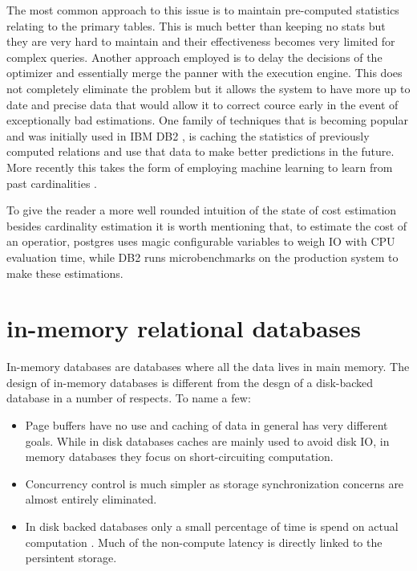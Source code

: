 The most common approach to this issue is to maintain pre-computed
statistics relating to the primary tables. This is much better than
keeping no stats but they are very hard to maintain and their
effectiveness becomes very limited for complex queries. Another
approach employed is to delay the decisions of the optimizer and
essentially merge the panner with the execution engine. This does not
completely eliminate the problem but it allows the system to have more
up to date and precise data that would allow it to correct cource
early in the event of exceptionally bad estimations. One family of
techniques that is becoming popular and was initially used in IBM DB2
\cite{stillgerLEODB2LearningOptimizer2001}, is caching the statistics
of previously computed relations and use that data to make better
predictions in the future. More recently this takes the form of
employing machine learning to learn from past cardinalities
\cite{ortizEmpiricalAnalysisDeep2019}.

To give the reader a more well rounded intuition of the state of cost
estimation besides cardinality estimation it is worth mentioning that,
to estimate the cost of an operatior, postgres uses magic configurable
variables to weigh IO with CPU evaluation time, while DB2 runs
microbenchmarks on the production system to make these estimations.


\section{in-memory relational databases}
\label{sec:org96af629}
In-memory databases are databases where all the data lives in main
memory. The design of in-memory databases is different from the desgn
of a disk-backed database in a number of respects. To name a few:

\begin{itemize}
\item Page buffers have no use and caching of data in general has very
different goals. While in disk databases caches are mainly used to
avoid disk IO, in memory databases they focus on short-circuiting
computation.
\item Concurrency control is much simpler as storage synchronization
concerns are almost entirely eliminated.
\item In disk backed databases only a small percentage of time is spend on
actual computation \cite{harizopoulosOLTPLookingGlass2018}. Much of
the non-compute latency is directly linked to the persintent
storage.
\end{itemize}

